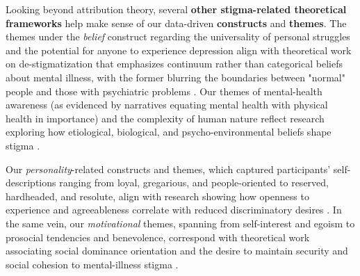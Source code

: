 Looking beyond attribution theory, several \textbf{other stigma-related theoretical frameworks} help make sense of our data-driven \textbf{constructs} and \textbf{themes}.
The themes under the \textit{belief} construct regarding the universality of personal struggles and the potential for anyone to experience depression align with theoretical work on de-stigmatization that emphasizes continuum rather than categorical beliefs about mental illness, with the former blurring the boundaries between "normal" people and those with psychiatric problems \cite{belief_reviewer_peter_2021}.
Our themes of mental-health awareness (as evidenced by narratives equating mental health with physical health in importance) and the complexity of human nature reflect research exploring how etiological, biological, and psycho-environmental beliefs shape stigma \cite{factor_valery_2020, factor_frost_2024}.





Our \textit{personality}-related constructs and themes, which captured participants' self-descriptions ranging from loyal, gregarious, and people-oriented to reserved, hardheaded, and resolute, align with research showing how openness to experience and agreeableness correlate with reduced discriminatory desires \cite{personality_reviewer_steiger_2022}. 
In the same vein, our \textit{motivational} themes, spanning from self-interest and egoism to prosocial tendencies and benevolence, correspond with theoretical work associating social dominance orientation and the desire to maintain security and social cohesion to mental-illness stigma \cite{motivational_reviewer_kvaale_2016}.


